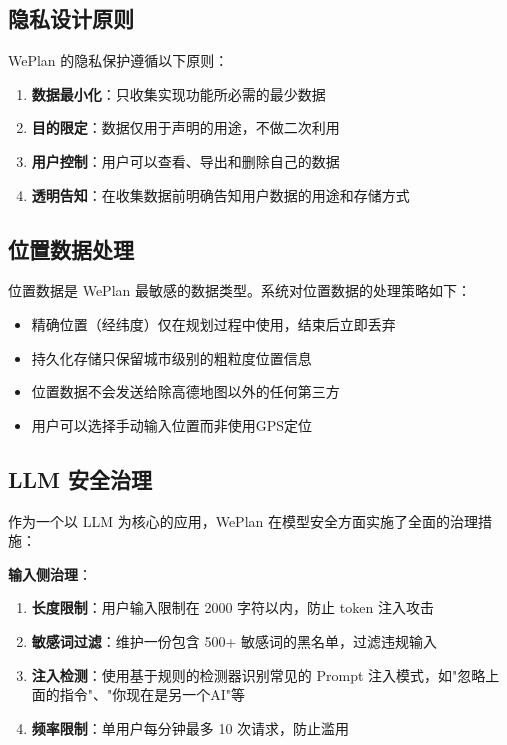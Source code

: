 \documentclass[12pt,a4paper]{ctexart}
\begin{document}
\subsection{隐私设计原则}

WePlan 的隐私保护遵循以下原则：

\begin{enumerate}[leftmargin=2em]
  \item \textbf{数据最小化}：只收集实现功能所必需的最少数据
  \item \textbf{目的限定}：数据仅用于声明的用途，不做二次利用
  \item \textbf{用户控制}：用户可以查看、导出和删除自己的数据
  \item \textbf{透明告知}：在收集数据前明确告知用户数据的用途和存储方式
\end{enumerate}

\subsection{位置数据处理}

位置数据是 WePlan 最敏感的数据类型。系统对位置数据的处理策略如下：

\begin{itemize}[leftmargin=2em]
  \item 精确位置（经纬度）仅在规划过程中使用，结束后立即丢弃
  \item 持久化存储只保留城市级别的粗粒度位置信息
  \item 位置数据不会发送给除高德地图以外的任何第三方
  \item 用户可以选择手动输入位置而非使用GPS定位
\end{itemize}

\subsection{LLM 安全治理}

作为一个以 LLM 为核心的应用，WePlan 在模型安全方面实施了全面的治理措施：

\textbf{输入侧治理}：

\begin{enumerate}[leftmargin=2em]
  \item \textbf{长度限制}：用户输入限制在 2000 字符以内，防止 token 注入攻击
  \item \textbf{敏感词过滤}：维护一份包含 500+ 敏感词的黑名单，过滤违规输入
  \item \textbf{注入检测}：使用基于规则的检测器识别常见的 Prompt 注入模式，如"忽略上面的指令"、"你现在是另一个AI"等
  \item \textbf{频率限制}：单用户每分钟最多 10 次请求，防止滥用
\end{enumerate}
\end{document}
